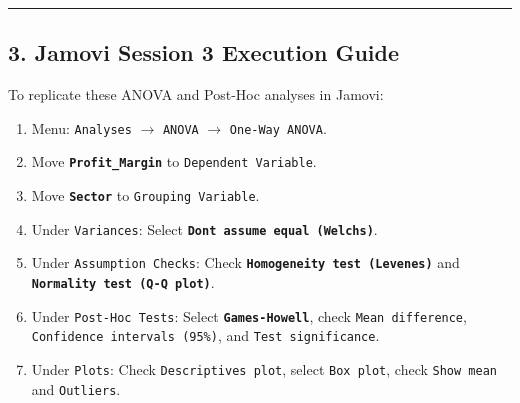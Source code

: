 \documentclass[
]{article}
\providecommand{\tightlist}{%
  \setlength{\itemsep}{0pt}\setlength{\parskip}{0pt}}
\begin{document}
\begin{center}\rule{0.5\linewidth}{0.5pt}\end{center}

\subsection{3. Jamovi Session 3 Execution
Guide}\label{jamovi-session-3-execution-guide}

To replicate these ANOVA and Post-Hoc analyses in Jamovi:

\begin{enumerate}
\def\labelenumi{\arabic{enumi}.}
\tightlist
\item
  Menu: \texttt{Analyses} \(\rightarrow\) \texttt{ANOVA} \(\rightarrow\)
  \texttt{One-Way\ ANOVA}.
\item
  Move \textbf{\texttt{Profit\_Margin}} to \texttt{Dependent\ Variable}.
\item
  Move \textbf{\texttt{Sector}} to \texttt{Grouping\ Variable}.
\item
  Under \texttt{Variances}: Select
  \textbf{\texttt{Don\textquotesingle{}t\ assume\ equal\ (Welch\textquotesingle{}s)}}.
\item
  Under \texttt{Assumption\ Checks}: Check
  \textbf{\texttt{Homogeneity\ test\ (Levene\textquotesingle{}s)}} and
  \textbf{\texttt{Normality\ test\ (Q-Q\ plot)}}.
\item
  Under \texttt{Post-Hoc\ Tests}: Select \textbf{\texttt{Games-Howell}},
  check \texttt{Mean\ difference},
  \texttt{Confidence\ intervals\ (95\%)}, and
  \texttt{Test\ significance}.
\item
  Under \texttt{Plots}: Check \texttt{Descriptives\ plot}, select
  \texttt{Box\ plot}, check \texttt{Show\ mean} and \texttt{Outliers}.
\end{enumerate}
\end{document}
